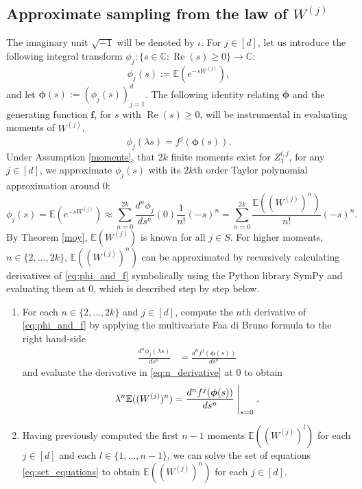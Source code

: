 \documentclass[preprint,3p,12pt]{elsarticle}
\theoremstyle{definition}
\begin{document}
\subsection{Approximate sampling from the law of $W^{(j)}$}
The imaginary unit $\sqrt{-1}$ will be denoted by $\iota$. For $j \in [d]$, let us introduce the following integral transform $\phi_j : \{s \in \mathbb{C}: \operatorname{Re}(s)\ge 0\} \rightarrow \mathbb{C}$:
\begin{equation*}
    \phi_j(s) := \mathbb{E}(e^{-sW^{(j)}}),
\end{equation*}
and let $\boldsymbol{\phi}(s):= (\phi_j(s))_{j=1}^d$. 
The following identity \cite[Chapter 5.6]{athreya_ney} relating $\boldsymbol\phi$ and the generating function $\boldsymbol{f}$, for $s$ with $\operatorname{Re}(s) \ge 0$, will be instrumental in evaluating moments of $W^{(j)}$, 
\begin{equation}
    \phi_j(\lambda s) = f^j(\boldsymbol{\phi}(s)) \label{eq:phi_and_f}.
\end{equation}
Under Assumption \ref{moments}, that $2k$ finite moments exist for $Z_1^{i,j}$, for any $j \in [d]$, we approximate $\phi_j(s)$ with its $2k$th order Taylor polynomial approximation around 0:
\begin{equation}
    \phi_j(s) =\mathbb{E}(e^{-sW^{(j)}}) \approx  \sum_{n=0}^{2k} \frac{d^n \phi_j}{d s^n}(0) \frac{1}{n!}(-s)^n = \sum_{n=0}^{2k} \frac{\mathbb{E}((W^{(j)})^n)}{n!} (-s)^n \label{eq:approximation}.
\end{equation}
By Theorem \ref{moy}, $\mathbb{E}(W^{(j)})$ is known for all $j \in S$. For higher moments, $n \in \{2,\dots,2k\}$, $\mathbb{E}((W^{(j)})^n)$ can be approximated by recursively calculating derivatives of \eqref{eq:phi_and_f} symbolically using the Python library SymPy \cite{software:sympy} and evaluating them at 0, which is described step by step below. 
\begin{enumerate}
    \item For each $n \in \{2,\dots,2k\}$ and $j \in [d]$, compute the $n$th derivative of \eqref{eq:phi_and_f} by applying the multivariate Faa di Bruno formula \cite{faa} to the right hand-side
\begin{align}
\frac{d^n \phi_j(\lambda s)}{d s^n} &= \frac{d^n f^j(\boldsymbol{\phi}(s))}{d s^n}  \label{eq:n_derivative}
\end{align}
   and evaluate the derivative in \eqref{eq:n_derivative} at 0 to obtain
    \begin{equation}
    \lambda^n \mathbb{E}((W^{(j)})^n) = \frac{d^n f^j(\boldsymbol{\phi}(s))}{d s^n}\Biggm|_{s=0} \label{eq:set_equations}.
\end{equation}
\item Having previously computed the first $n-1$ moments $\mathbb{E}((W^{(j)})^l)$ for each $j\in[d]$ and each $l \in\{1,\dots,n-1\}$, we can solve the set of equations \eqref{eq:set_equations} to obtain $\mathbb{E}((W^{(j)})^n)$ for each $j\in[d]$.
\end{enumerate}
\end{document}
